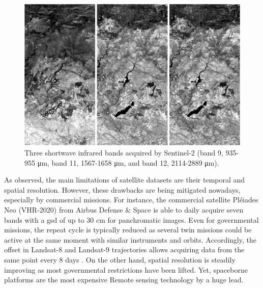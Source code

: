 \begin{figure}[!ht]
	\includegraphics{figs/introduction/sentinel2_bands.png}
	\caption{Three shortwave infrared bands acquired by Sentinel-2 (band 9, 935-955 \si{\micro\meter}, band 11, 1567-1658 \si{\micro\meter}, and band 12, 2114-2889 \si{\micro\meter}). }
    \label{fig:sentinel2}
\end{figure}

As observed, the main limitations of satellite datasets are their temporal and spatial resolution. However, these drawbacks are being mitigated nowadays, especially by commercial missions. For instance, the commercial satellite Pléiades Neo (VHR-2020) from Airbus Defense \& Space \cite{airbus_pleiades_2021} is able to daily acquire seven bands with a \acrshort{gsd} of up to 30 \si{\centi\meter} for panchromatic images. Even for governmental missions, the repeat cycle is typically reduced as several twin missions could be active at the same moment with similar instruments and orbits. Accordingly, the offset in Landsat-8 and Landsat-9 trajectories allows acquiring data from the same point every 8 days \cite{masek_landsat_2020}. On the other hand, spatial resolution is steadily improving as most governmental restrictions have been lifted. Yet, spaceborne platforms are the most expensive Remote sensing technology by a huge lead. 

